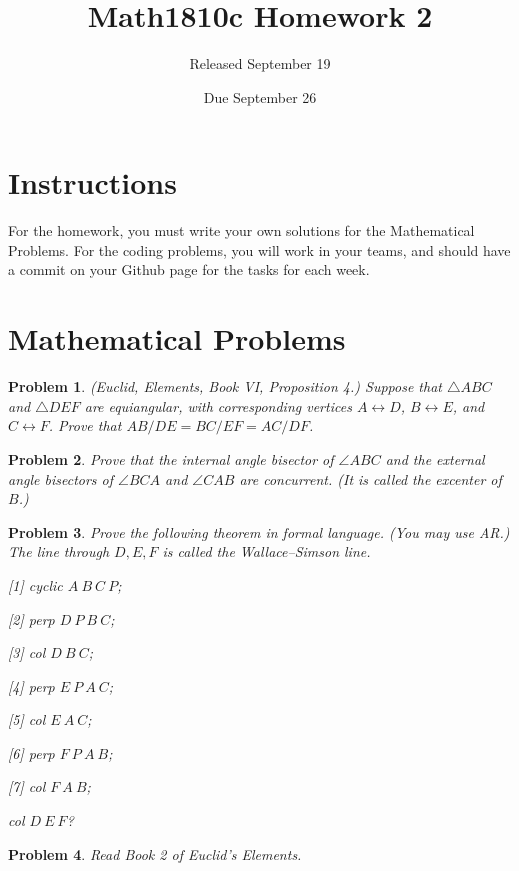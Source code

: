\documentclass{article}
\title{Math1810c Homework 2}
\author{Released September 19}
\date{Due September 26}
\newtheorem{problem}{Problem}
\begin{document}
\maketitle

\section{Instructions}

For the homework, you must write your own solutions for the Mathematical Problems. For the coding problems, you will work in your teams, and should have a commit on your Github page for the tasks for each week. 

\section{Mathematical Problems}

\begin{problem}
    (Euclid, \emph{Elements}, Book VI, Proposition 4.) Suppose that
    $\triangle ABC$ and $\triangle DEF$ are equiangular, with corresponding
    vertices $A\leftrightarrow D$, $B\leftrightarrow E$, and
    $C\leftrightarrow F$. Prove that $AB/DE = BC/EF = AC/DF$.
\end{problem}

\begin{problem}
Prove that the internal angle bisector of $\angle ABC$ and the external angle bisectors of $\angle BCA$ and $\angle CAB$ are concurrent. (It is called the excenter of $B$.)
\end{problem}

\begin{problem}
Prove the following theorem in formal language. (You may use AR.) The line
through $D,E,F$ is called the Wallace--Simson line.

[1] cyclic $A~B~C~P$;

[2] perp $D~P~B~C$;

[3] col $D~B~C$;

[4] perp $E~P~A~C$;

[5] col $E~A~C$;

[6] perp $F~P~A~B$;

[7] col $F~A~B$;

col $D~E~F$?

\end{problem}

\begin{problem}
    Read Book 2 of Euclid's Elements.
\end{problem}
\newpage
\end{document}
